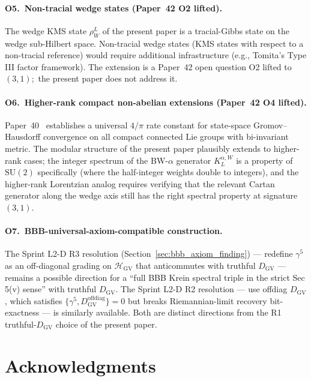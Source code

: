 \documentclass[11pt,a4paper]{article}
\theoremstyle{plain}
\theoremstyle{definition}
\newcommand{\Hilb}{\mathcal{H}}
\newcommand{\SU}{\mathrm{SU}}
\newcommand{\DGV}{D_{\mathrm{GV}}}
\newcommand{\KL}{K_{L}}
\begin{document}
\paragraph{O5.\ Non-tracial wedge states (Paper~42 O2 lifted).}
The wedge KMS state $\rho_W^L$ of the present paper is a tracial-Gibbs
state on the wedge sub-Hilbert space. Non-tracial wedge states (KMS
states with respect to a non-tracial reference) would require additional
infrastructure (e.g., Tomita's Type III factor framework). The
extension is a Paper~42 open question O2 lifted to $(3, 1)$;\
the present paper does not address it.

\paragraph{O6.\ Higher-rank compact non-abelian extensions (Paper~42 O4
lifted).} Paper~40~\cite{paper40_unified} establishes a universal
$4/\pi$ rate constant for state-space Gromov--Hausdorff convergence on all compact
connected Lie groups with bi-invariant metric. The modular structure
of the present paper plausibly extends to higher-rank cases; the
integer spectrum of the BW-$\alpha$ generator $\KL^{\alpha, W}$ is a
property of $\SU(2)$ specifically (where the half-integer weights
double to integers), and the higher-rank Lorentzian analog requires
verifying that the relevant Cartan generator along the wedge axis
still has the right spectral property at signature $(3, 1)$.

\paragraph{O7.\ BBB-universal-axiom-compatible construction.}
The Sprint L2-D R3 resolution
(Section~\ref{sec:bbb_axiom_finding}) — redefine $\gamma^5$ as an
off-diagonal grading on $\Hilb_{\mathrm{GV}}$ that anticommutes with
truthful $\DGV$ — remains a possible direction for a ``full BBB
Krein spectral triple in the strict Sec 5(v) sense'' with truthful
$\DGV$. The Sprint L2-D R2 resolution — use offdiag $\DGV$, which
satisfies $\{\gamma^5, \DGV^{\mathrm{offdiag}}\} = 0$ but breaks
Riemannian-limit recovery bit-exactness — is similarly available. Both
are distinct directions from the R1 truthful-$\DGV$ choice of the
present paper.

\section*{Acknowledgments}
\end{document}
